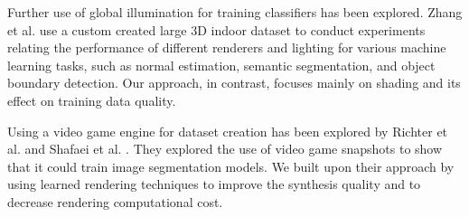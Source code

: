 \documentclass[10pt,twocolumn,letterpaper]{article}
\begin{document}
Further use of global illumination for training classifiers has been explored.
Zhang et al. \cite{DBLP:journals/corr/ZhangSYSLJF16} use a custom created large 3D indoor dataset to conduct experiments relating the performance of different renderers and lighting for various machine learning tasks, such as normal estimation, semantic segmentation, and object boundary detection. Our approach, in contrast, focuses mainly on shading and its effect on training data quality. 




Using a video game engine for dataset creation has been explored by Richter et al. \cite{DBLP:journals/corr/RichterVRK16} and  Shafaei et al. \cite{DBLP:journals/corr/ShafaeiLS16}. They explored the use of video game snapshots to show that it could train image segmentation models. We built upon their approach by using learned rendering techniques to improve the synthesis quality and to decrease rendering computational cost.

\end{document}
